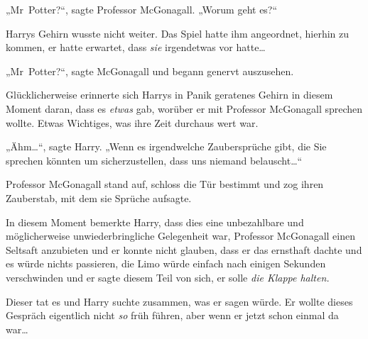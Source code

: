 „Mr~Potter?“, sagte Professor McGonagall. „Worum geht es?“

Harrys Gehirn wusste nicht weiter. Das Spiel hatte ihm angeordnet, hierhin zu kommen, er hatte erwartet, dass \emph{sie} irgendetwas vor hatte…

„Mr~Potter?“, sagte McGonagall und begann genervt auszusehen.

Glücklicherweise erinnerte sich Harrys in Panik geratenes Gehirn in diesem Moment daran, dass es \emph{etwas} gab, worüber er mit Professor McGonagall sprechen wollte. Etwas Wichtiges, was ihre Zeit durchaus wert war.

„Ähm…“, sagte Harry. „Wenn es irgendwelche Zaubersprüche gibt, die Sie sprechen könnten um sicherzustellen, dass uns niemand belauscht…“

Professor McGonagall stand auf, schloss die Tür bestimmt und zog ihren Zauberstab, mit dem sie Sprüche aufsagte.

In diesem Moment bemerkte Harry, dass dies eine unbezahlbare und möglicherweise unwiederbringliche Gelegenheit war, Professor McGonagall einen Seltsaft anzubieten und er konnte nicht glauben, dass er das ernsthaft dachte und es würde nichts passieren, die Limo würde einfach nach einigen Sekunden verschwinden und er sagte diesem Teil von sich, er solle \emph{die Klappe halten.}

Dieser tat es und Harry suchte zusammen, was er sagen würde. Er wollte dieses Gespräch eigentlich nicht \emph{so} früh führen, aber wenn er jetzt schon einmal da war…

